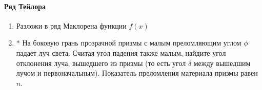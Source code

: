 \paragraph{Ряд Тейлора}
\begin{enumerate}
    \item Разложи в ряд Маклорена функции $f(x)$
    \item $\boldsymbol{*}$ На боковую грань прозрачной призмы с малым преломляющим углом $\phi$ падает луч света. Считая угол падения также малым, найдите угол отклонения луча, вышедшего из призмы (то есть угол $\delta$ между вышедшим лучом и первоначальным). Показатель преломления материала призмы равен $n$.
\end{enumerate}